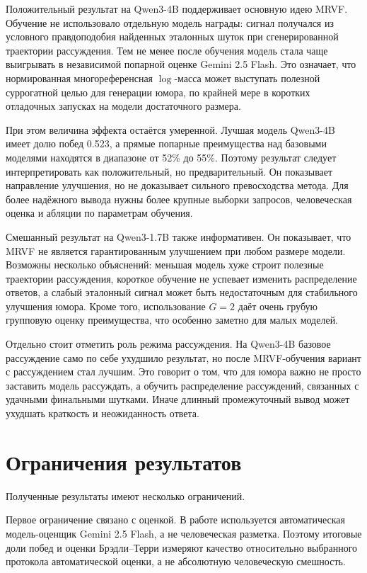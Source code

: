 Положительный результат на Qwen3-4B поддерживает основную идею MRVF. Обучение не использовало отдельную модель награды: сигнал получался из условного правдоподобия найденных эталонных шуток при сгенерированной траектории рассуждения. Тем не менее после обучения модель стала чаще выигрывать в независимой попарной оценке Gemini 2.5 Flash. Это означает, что нормированная многореференсная \(\log\)-масса может выступать полезной суррогатной целью для генерации юмора, по крайней мере в коротких отладочных запусках на модели достаточного размера.

При этом величина эффекта остаётся умеренной. Лучшая модель Qwen3-4B имеет долю побед 0.523, а прямые попарные преимущества над базовыми моделями находятся в диапазоне от 52\% до 55\%. Поэтому результат следует интерпретировать как положительный, но предварительный. Он показывает направление улучшения, но не доказывает сильного превосходства метода. Для более надёжного вывода нужны более крупные выборки запросов, человеческая оценка и абляции по параметрам обучения.

Смешанный результат на Qwen3-1.7B также информативен. Он показывает, что MRVF не является гарантированным улучшением при любом размере модели. Возможны несколько объяснений: меньшая модель хуже строит полезные траектории рассуждения, короткое обучение не успевает изменить распределение ответов, а слабый эталонный сигнал может быть недостаточным для стабильного улучшения юмора. Кроме того, использование \(G=2\) даёт очень грубую групповую оценку преимущества, что особенно заметно для малых моделей.

Отдельно стоит отметить роль режима рассуждения. На Qwen3-4B базовое рассуждение само по себе ухудшило результат, но после MRVF-обучения вариант с рассуждением стал лучшим. Это говорит о том, что для юмора важно не просто заставить модель рассуждать, а обучить распределение рассуждений, связанных с удачными финальными шутками. Иначе длинный промежуточный вывод может ухудшать краткость и неожиданность ответа.

\section{Ограничения результатов}

Полученные результаты имеют несколько ограничений.

Первое ограничение связано с оценкой. В работе используется автоматическая модель-оценщик Gemini 2.5 Flash, а не человеческая разметка. Поэтому итоговые доли побед и оценки Брэдли--Терри измеряют качество относительно выбранного протокола автоматической оценки, а не абсолютную человеческую смешность.

